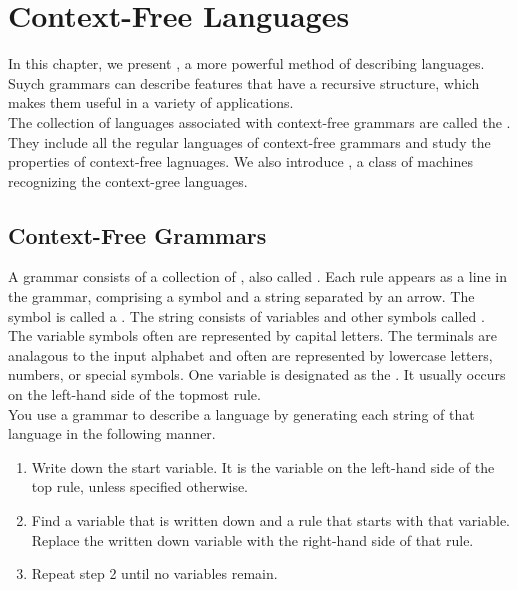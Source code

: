 \documentclass{article}
\begin{document}
\section{Context-Free Languages}

In this chapter, we present , a more powerful method of describing languages. Suych grammars can describe features that have a recursive structure, which makes them useful in a variety of applications. \\ 

The collection of languages associated with context-free grammars are called the . They include all the regular languages of context-free grammars and study the properties of context-free lagnuages. We also introduce , a class of machines recognizing the context-gree languages. 

\subsection{Context-Free Grammars}

A grammar consists of a collection of , also called . Each rule appears as a line in the grammar, comprising a symbol and a string separated by an arrow. The symbol is called a . The string consists of variables and other symbols called . The variable symbols often are represented by capital letters. The terminals are analagous to the input alphabet and often are represented by lowercase letters, numbers, or special symbols. One variable is designated as the . It usually occurs on the left-hand side of the topmost rule. \\ 

You use a grammar to describe a language by generating each string of that language in the following manner.  
\begin{enumerate}
  \item Write down the start variable. It is the variable on the left-hand side of the top rule, unless specified otherwise. 
  \item Find a variable that is written down and a rule that starts with that variable. Replace the written down variable with the right-hand side of that rule. 
  \item Repeat step 2 until no variables remain. 
\end{enumerate}
\end{document}
